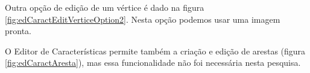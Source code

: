 Outra opção de edição de um vértice é dado na figura \ref{fig:edCaractEditVerticeOption2}. Nesta opção podemos usar uma imagem pronta.
\begin{figure}[h]
	\centering	
\end{figure}
\FloatBarrier

O Editor de Características permite também a criação e edição de arestas (figura \ref{fig:edCaractAresta}), mas essa funcionalidade não foi necessária nesta pesquisa.
\begin{figure}[h]
	\centering	
\end{figure}
\FloatBarrier

